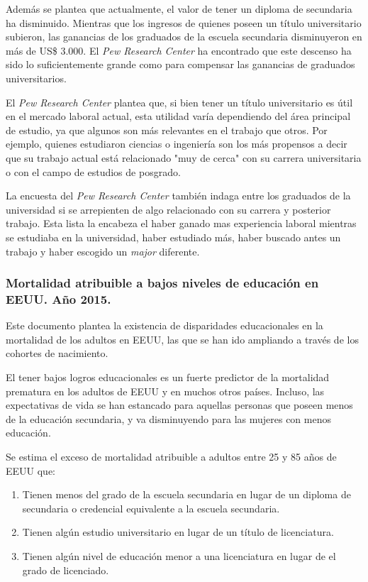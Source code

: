 Además se plantea que actualmente, el valor de tener un diploma de secundaria ha disminuido. Mientras que los ingresos de quienes poseen un título universitario subieron, las ganancias de los graduados de la escuela secundaria disminuyeron en más de US\$ 3.000. El \textit{Pew Research Center} ha encontrado que este descenso ha sido lo suficientemente grande como para compensar las ganancias de graduados universitarios. 

El \textit{Pew Research Center} plantea que, si bien tener un título universitario es útil en el mercado laboral actual, esta utilidad varía dependiendo del área principal de estudio, ya que algunos son más relevantes en el trabajo que otros. Por ejemplo, quienes estudiaron ciencias o ingeniería son los más propensos a decir que su trabajo actual está relacionado "muy de cerca" con su carrera universitaria o con el campo de estudios de posgrado.

La encuesta del \textit{Pew Research Center} también indaga entre los graduados de la universidad si se arrepienten de algo relacionado con su carrera y posterior trabajo. Esta lista la encabeza el haber ganado mas experiencia laboral mientras se estudiaba en la universidad, haber estudiado más, haber buscado antes un trabajo y haber escogido un \textit{major} diferente. 


\subsubsection{Mortalidad atribuible a bajos niveles de educación en EEUU. Año 2015.}
Este documento plantea la existencia de disparidades educacionales en la mortalidad de los adultos en EEUU, las que se han ido ampliando a través de los cohortes de nacimiento. 

El tener bajos logros educacionales es un fuerte predictor de la mortalidad prematura en los adultos de EEUU y en muchos otros países. Incluso, las expectativas de vida se han estancado para aquellas personas que poseen menos de la educación secundaria, y va disminuyendo para las mujeres con menos educación. 

Se estima el exceso de mortalidad atribuible a adultos entre 25 y 85 años de EEUU que:
\begin{enumerate}
\item Tienen menos del grado de la escuela secundaria en lugar de un diploma de secundaria o credencial equivalente a la escuela secundaria.
\item Tienen algún estudio universitario en lugar de un título de licenciatura.
\item Tienen algún nivel de educación menor a una licenciatura en lugar de el grado de licenciado.
\end{enumerate}

